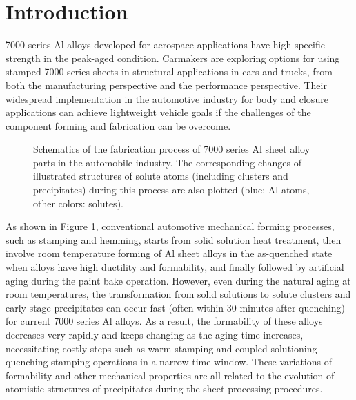 \section{Introduction}
\label{Chap:Al/Vac:section:Intro}

7000 series Al alloys developed for aerospace applications have high specific strength in the peak-aged condition. Carmakers are exploring options for using stamped 7000 series sheets in structural applications in cars and trucks, from both the manufacturing perspective and the performance perspective. Their widespread implementation in the automotive industry for body and closure applications can achieve lightweight vehicle goals if the challenges of the component forming and fabrication can be overcome\cite{fridlyander2002aluminum,hirsch2011aluminium,hirsch2014recent}.

\begingroup
\begin{figure}[!ht]
  \centering
\caption[Schematics of the fabrication process of 7000 series Al sheet alloy parts in the automobile industry.]{Schematics of the fabrication process of 7000 series Al sheet alloy parts in the automobile industry. The corresponding changes of illustrated structures of solute atoms (including clusters and precipitates) during this process are also plotted (blue: Al atoms, other colors: solutes).}
  \label{Chap:Al/Vac:fig1}
\end{figure}
\endgroup

As shown in Figure \ref{Chap:Al/Vac:fig1}, conventional automotive mechanical forming processes, such as stamping and hemming, starts from solid solution heat treatment, then involve room temperature forming of Al sheet alloys in the as-quenched state when alloys have high ductility and formability, and finally followed by artificial aging during the paint bake operation. However, even during the natural aging at room temperatures, the transformation from solid solutions to solute clusters and early-stage precipitates can occur fast  (often within 30 minutes after quenching) for current 7000 series Al alloys. As a result, the formability of these alloys decreases very rapidly and keeps changing as the aging time increases, necessitating costly steps such as warm stamping and coupled solutioning-quenching-stamping operations in a narrow time window\cite{bryant1999effects,li2004biaxial}. These variations of formability and other mechanical properties are all related to the evolution of atomistic structures of precipitates during the sheet processing procedures.

